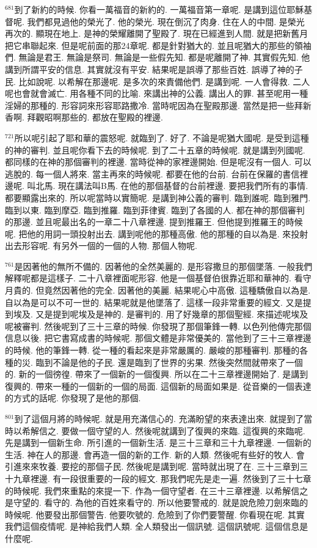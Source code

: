 \documentclass{book}
\begin{document}
$^{681}$到了新約的時候.
你看一萬福音的新約的.
一萬福音第一章呢.
是講到這位耶穌基督呢.
我們都見過他的榮光了.
他的榮光.
現在倒沉了肉身.
住在人的中間.
是榮光再次的.
顯現在地上.
是神的榮耀離開了聖殿了.
現在已經進到人間.
就是把新舊月把它串聯起來.
但是呢前面的那24章呢.
都是針對猶大的.
並且呢猶大的那些的領袖們.
無論是君王.
無論是祭司.
無論是一些假先知.
都是呢離開了神.
其實假先知.
他講到所謂平安的信息.
其實就沒有平安.
結果呢是誤導了那些百姓.
誤導了神的子民.
比如說呢.
以希解在那邊呢.
是多次的來責備他們.
是講到呢.
一人會得救.
二人呢也會就會滅亡.
用各種不同的比喻.
來講出神的公義.
講出人的罪.
甚至呢用一種淫婦的那種的.
形容詞來形容耶路撒冷.
當時呢因為在聖殿那邊.
當然是把一些拜新香啊.
拜觀昭啊那些的.
都放在聖殿的裡邊.

$^{721}$所以呢引起了耶和華的震怒呢.
就臨到了.
好了.
不論是呢猶大國呢.
是受到這種的神的審判.
並且呢你看下去的時候呢.
到了二十五章的時候呢.
就是講到列國呢.
都同樣的在神的那個審判的裡邊.
當時從神的家裡邊開始.
但是呢沒有一個人.
可以逃脫的.
每一個人將來.
當主再來的時候呢.
都要在他的台前.
台前在保羅的書信裡邊呢.
叫北馬.
現在講法叫B馬.
在他的那個基督的台前裡邊.
要把我們所有的事情.
都要顯露出來的.
所以呢當時以實簡呢.
是講到神公義的審判.
臨到誰呢.
臨到雅門.
臨到以東.
臨到摩亞.
臨到推羅.
臨到菲律賓.
臨到了各國的人.
都在神的那個審判的那邊.
並且呢最出名的一章二十八章裡邊.
提到推羅王.
但他提到推羅王的時候呢.
把他的用詞一頭投射出去.
講到呢他的那種高傲.
他的那種的自以為是.
來投射出去形容呢.
有另外一個的一個的人物.
那個人物呢.

$^{761}$是因著他的無所不備的.
因著他的全然美麗的.
是形容撒旦的那個墜落.
一般我們解釋呢都是這樣子.
二十八章裡面呢形容.
他是一個基督伯很靠近耶和華神的.
看守月貴的.
但竟然因著他的完全.
因著他的美麗.
結果呢心中高傲.
這種驕傲自以為是.
自以為是可以不可一世的.
結果呢就是他墜落了.
這樣一段非常重要的經文.
又是提到埃及.
又是提到呢埃及是神的.
是審判的.
用了好幾章的那個聖經.
來描述呢埃及呢被審判.
然後呢到了三十三章的時候.
你發現了那個筆鋒一轉.
以色列他傳完那個信息以後.
把它書寫成書的時候呢.
那個文體是非常優美的.
當他到了三十三章裡邊的時候.
他的筆鋒一轉.
從一種的看起來是非常嚴厲的.
嚴峻的那種審判.
那種的各種的災.
臨到不論是他的子民.
還是臨到了世界的劣果.
然後突然間就帶來了一個的.
新的一個徬徨.
帶來了一個新的一個復興.
所以在二十三章裡邊開始了.
是講到復興的.
帶來一種的一個新的一個的局面.
這個新的局面如果是.
從音樂的一個表達的方式的話呢.
你發現了是他的那個.

$^{801}$到了這個月將的時候呢.
就是用充滿信心的.
充滿盼望的來表達出來.
就提到了當時以希解信之.
要做一個守望的人.
然後呢就講到了復興的來臨.
這復興的來臨呢.
先是講到一個新生命.
所引進的一個新生活.
是三十三章和三十九章裡邊.
一個新的生活.
神在人的那邊.
會再造一個的新的工作.
新的人類.
然後呢有些好的牧人.
會引進來來牧養.
要挖的那個子民.
然後呢是講到呢.
當時就出現了在.
三十三章到三十九章裡邊.
有一段很重要的一段的經文.
那我們呢先是走一遍.
然後到了三十七章的時候呢.
我們來重點的來提一下.
作為一個守望者.
在三十三章裡邊.
以希解信之是守望的.
看守的.
為他的百姓來看守的.
所以他要警戒的.
就是說危險刀劍來臨的時候呢.
他要發出那個警告.
他要吹號的.
危險到了你們要警醒.
你看現在呢.
其實我們這個疫情呢.
是神給我們人類.
全人類發出一個訊號.
這個訊號呢.
這個信息是什麼呢.
\end{document}
